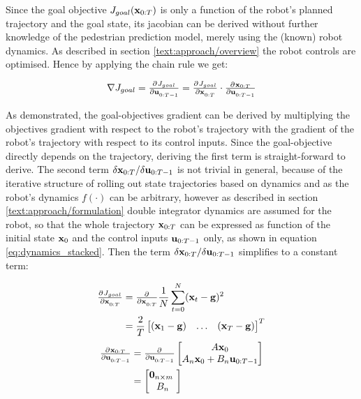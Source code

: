 Since the goal objective $J_{goal}(\mathbf{x}_{0:T})$ is only a function of the robot's planned trajectory and the goal state, its jacobian can be derived without further knowledge of the pedestrian prediction model, merely using the (known) robot dynamics. As described in section \ref{text:approach/overview} the robot controls are optimised. Hence by applying the chain rule we get: 

\begin{equation}
\nabla J_{goal} = \pd{J_{goal}}{\u_{0:T-1}} = \pd{J_{goal}}{\x_{0:T}} \cdot \pd{\x_{0:T}}{\u_{0:T-1}}
\end{equation}

As demonstrated, the goal-objectives gradient can be derived by multiplying the objectives gradient with respect to the robot's trajectory with the gradient of the robot's trajectory with respect to its control inputs. Since the goal-objective directly depends on the trajectory, deriving the first term is straight-forward to derive. The second term $\delta \mathbf{x}_{0:T} / \delta \mathbf{u}_{0:T-1}$ is not trivial in general, because of the iterative structure of rolling out state trajectories based on dynamics and as the robot's dynamics $f(\cdot)$ can be arbitrary, however as described in section \ref{text:approach/formulation} double integrator dynamics are assumed for the robot, so that the whole trajectory $\mathbf{x}_{0:T}$ can be expressed as function of the initial state $\mathbf{x}_0$ and the control inputs $\mathbf{u}_{0:T-1}$ only, as shown in equation \ref{eq:dynamics_stacked}. Then the term $\delta \mathbf{x}_{0:T} / \delta \mathbf{u}_{0:T-1}$ simplifies to a constant term:

\begin{align}
\pd{J_{goal}}{\x_{0:T}} &= \pd{}{\x_{0:T}} \frac{1}{N} \sum_{t = 0}^N (\x_t - \mathbf{g})^2 \\
&= \frac{2}{T} \begin{bmatrix} (\x_1 - \mathbf{g}) & \hdots & (\x_T - \mathbf{g}) \end{bmatrix}^T
\end{align}
\begin{align}
\pd{\x_{0:T}}{\u_{0:T-1}} &= \pd{}{\u_{0:T-1}} \begin{bmatrix} A \x_0 \\ A_n \x_0 + B_n \u_{0:T-1} \end{bmatrix} \\
&= \begin{bmatrix} \mathbf{0}_{n \times m} \\ B_n \end{bmatrix}
\label{eq:goal_gradient_dynamics}
\end{align}

